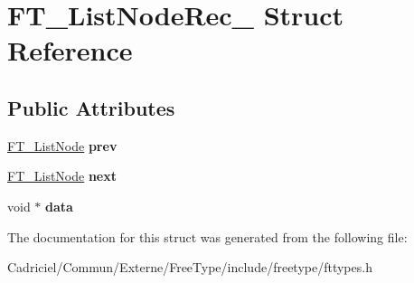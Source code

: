 \hypertarget{struct_f_t___list_node_rec__}{\section{F\-T\-\_\-\-List\-Node\-Rec\-\_\- Struct Reference}
\label{struct_f_t___list_node_rec__}
}
\subsection*{Public Attributes}
\begin{DoxyCompactItemize}
\item 
\hypertarget{struct_f_t___list_node_rec___a41c77950e6940b1b98e04709b705c046}{\hyperlink{struct_f_t___list_node_rec__}{F\-T\-\_\-\-List\-Node} {\bfseries prev}}\label{struct_f_t___list_node_rec___a41c77950e6940b1b98e04709b705c046}

\item 
\hypertarget{struct_f_t___list_node_rec___a8275962fa8c92b77435cb4fa76251f39}{\hyperlink{struct_f_t___list_node_rec__}{F\-T\-\_\-\-List\-Node} {\bfseries next}}\label{struct_f_t___list_node_rec___a8275962fa8c92b77435cb4fa76251f39}

\item 
\hypertarget{struct_f_t___list_node_rec___ab0202be88f722442a4bec9aeb5f6418f}{void $\ast$ {\bfseries data}}\label{struct_f_t___list_node_rec___ab0202be88f722442a4bec9aeb5f6418f}

\end{DoxyCompactItemize}


The documentation for this struct was generated from the following file\-:\begin{DoxyCompactItemize}
\item 
Cadriciel/\-Commun/\-Externe/\-Free\-Type/include/freetype/fttypes.\-h\end{DoxyCompactItemize}
